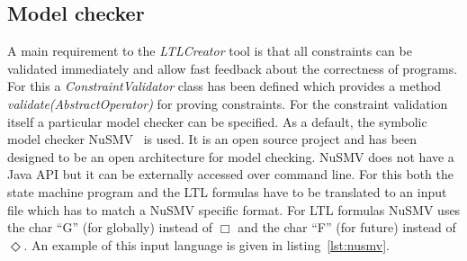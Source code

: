 \subsection{Model checker}

A main requirement to the \emph{LTLCreator} tool is that all constraints can be validated immediately and allow fast feedback about the correctness of programs. For this a \emph{ConstraintValidator} class has been defined which provides a method \emph{validate(AbstractOperator)} for proving constraints.
For the constraint validation itself a particular model checker can be specified. As a default, the symbolic model checker NuSMV~\cite{springerlink:10.1007/s100090050046,NuSMV2} is used. It is an open source project and has been designed to be an open architecture for model checking. NuSMV does not have a Java API but it can be externally accessed over command line. For this both the state machine program and the LTL formulas have to be translated to an input file which has to match a NuSMV specific format. For LTL formulas NuSMV uses the char ``G'' (for globally) instead of $\Box$ and the char ``F'' (for future) instead of $\Diamond$. An example of this input language is given in listing~\ref{lst:nusmv}.

